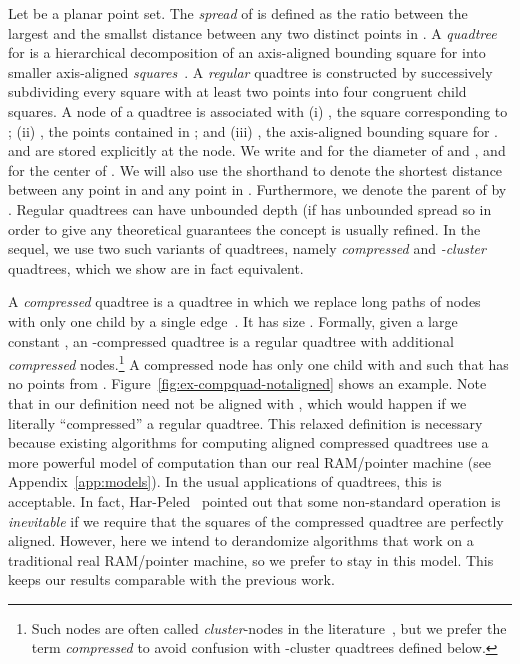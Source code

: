 \documentclass[11pt]{paper}
\begin{document}
    Let  be a planar point set.
    The \emph{spread} of  is defined as the
    ratio between the largest and the smallst distance between
    any two distinct points in .
    A \emph{quad\-tree} for  is a hi\-erarchical
    decomposition of an axis-aligned bounding square for  into smaller
    axis-aligned
    \emph{squares}~\cite{deBergChvKrOv08,FinkelBe74,HarPeled11,Samet90}.
    A \emph{regular} quadtree is constructed by
    successively subdividing every square with at least two points
    into four congruent child squares. A node  of a quadtree
    is associated with
    (i) , the square corresponding to ;
    (ii) , the points contained in ; 
    and (iii) , the axis-aligned bounding square for
    .
     and  are stored explicitly at the node.
    We write  and   for the diameter of
     and , and  for the center of .
    We will also use the shorthand 
    to denote the shortest distance between any point in  and
    any point in .
    Furthermore, we denote the parent of  by .
    Regular quadtrees can have unbounded depth (if  has unbounded 
    spread
    so in order to give any theoretical guarantees the concept is
    usually refined.
    In the sequel, we use two such variants of quadtrees, namely
    \emph{compressed} and \emph{-cluster} quadtrees,
    which we show are in fact equivalent.

    A \emph {compressed} quadtree is a quadtree in which we replace
    long paths of nodes with only one child by a single 
    edge~\cite{BernEpGi94,BernEpTe99,BuchinLoMoMuXX,Clarkson83}.
    It has size .  Formally,
    given a large constant , an -compressed quadtree
    is a regular quadtree with additional \emph{compressed} nodes.\footnote
    {Such nodes are often called \emph {cluster}-nodes in the
    literature~\cite{BernEpGi94,BernEpTe99,BuchinLoMoMuXX},
    but we prefer the term \emph {compressed} to avoid confusion with
    -cluster quadtrees defined below.}
    A compressed
    node  has only one child  with
     and such that 
    has no points from . 
    Figure~\ref {fig:ex-compquad-notaligned} shows an example.
     Note that in our definition
     need not be aligned with , which would
    happen if we literally ``compressed'' a regular quadtree.
    This relaxed definition is necessary because existing algorithms for 
    computing
    aligned compressed quadtrees use a more powerful model of
    computation than our real RAM/pointer machine
    (see Appendix~\ref{app:models}).  In the usual applications of quadtrees,
    this is acceptable. In fact, Har-Peled~\cite[Chapter~2]{HarPeled11}
    pointed out that some non-standard operation is
    \emph{inevitable} if we require that the squares of the compressed quadtree
    are perfectly aligned. However, here we intend to derandomize algorithms
    that work on a traditional real RAM/pointer machine, so we
    prefer to stay in this model. This keeps our results comparable with the
    previous work.
    
\end{document}
